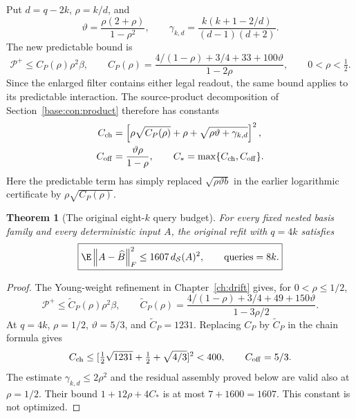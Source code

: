 \documentclass[11pt,oneside,openany,a4paper]{book}
\numberwithin{equation}{chapter}
\newtheorem{theorem}{Theorem}[chapter]
\theoremstyle{definition}
\theoremstyle{remark}
\newcommand{\F}[1]{\left\lVert#1\right\rVert_F}
\begin{document}
Put $d=q-2k$, $\rho=k/d$, and
\[
 \vartheta=\frac{\rho(2+\rho)}{1-\rho^2},\qquad
 \gamma_{k,d}=\frac{k(k+1-2/d)}{(d-1)(d+2)}.
\]
The new predictable bound is
\[
 \mathcal P^+\le C_P(\rho)\rho^2\beta,\qquad
 C_P(\rho)=
 \frac{4/(1-\rho)+3/4+33+100\vartheta}{1-2\rho},
 \qquad 0<\rho<\tfrac12.
\]
Since the enlarged filter contains either legal readout, the same bound
applies to its predictable interaction. The source-product decomposition of Section~\ref{base:con:product} therefore has constants
\begin{align*}
 C_{\rm ch}
 &=\left[\rho\sqrt{C_P(\rho)}+\rho+
                  \sqrt{\rho\vartheta+\gamma_{k,d}}\right]^2,\\
 C_{\rm off}&=\frac{\vartheta\rho}{1-\rho},\qquad
 C_*=\max\{C_{\rm ch},C_{\rm off}\}.
\end{align*}
Here the predictable term has simply replaced
$\sqrt{\rho\vartheta b}$ in the earlier logarithmic certificate by
$\rho\sqrt{C_P(\rho)}$.

\begin{theorem}[The original eight-$k$ query budget]
For every fixed nested basis family and every deterministic input $A$,
the original refit with $q=4k$ satisfies
\[
 \boxed{\E\F{A-\widehat B}^2\le1607\,d_{\mathcal S}(A)^2,
 \qquad\text{queries}=8k.}
\]
\end{theorem}
\begin{proof}
The Young-weight refinement in
Chapter~\ref{ch:drift} gives, for $0<\rho\le1/2$,
\[
 \mathcal P^+\le\widetilde C_P(\rho)\rho^2\beta,\qquad
 \widetilde C_P(\rho)=
 \frac{4/(1-\rho)+3/4+49+150\vartheta}{1-3\rho/2}.
\]
At $q=4k$, $\rho=1/2$, $\vartheta=5/3$, and
$\widetilde C_P=1231$. Replacing $C_P$ by $\widetilde C_P$ in
the chain formula gives
\[
 C_{\rm ch}\le
 [\tfrac12\sqrt{1231}+\tfrac12+\sqrt{4/3}]^2<400,
 \qquad C_{\rm off}=5/3.
\]
The estimate $\gamma_{k,d}\le2\rho^2$ and the residual assembly
proved below are valid also at $\rho=1/2$. Their bound
$1+12\rho+4C_*$ is at most $7+1600=1607$.
This constant is not optimized.
\end{proof}
\end{document}
